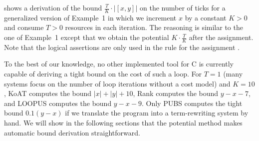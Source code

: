 \documentclass{sigplanconf}
\newcommand{\iffull}[2]{\ifx\fullversion\undefined{#2}\else{#1}\fi}
\newcommand{\pref}[1]{\prettyref{#1}}
\begin{document}
\pref{fig:ex1} shows a derivation of the bound
$\frac{T}{K}{\cdot}|[x,y]|$ on the number of ticks for a generalized
version of Example~1 in which we increment $x$ by a constant $K>0$ and
consume $T>0$ resources in each iteration.  The reasoning is similar
to the one of Example~1 except that we obtain the potential
$K{\cdot}\frac{T}{K}$ after the assignment.  Note that the logical
assertions are only used in the rule for the assignment
.

To the best of our knowledge, no other implemented tool for C is
currently capable of deriving a tight bound on the cost of such a
loop.  For $T=1$ (many systems focus on the number of loop iterations
without a cost model) and $K=10$, KoAT computes the bound $|x| + |y| +
10$, Rank computes the bound $y-x-7$, and LOOPUS computes the bound
$y-x-9$.  Only PUBS computes the tight bound $0.1(y-x)$ if we
translate the program into a term-rewriting system by
hand. We will show in the following sections that the
potential method makes automatic bound derivation straightforward.


\end{document}
